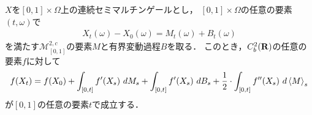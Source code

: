 	\begin{screen}
		\begin{thm}[伊藤の公式]
			$X$を$[0,1] \times \Omega$上の連続セミマルチンゲールとし，
			$[0,1] \times \Omega$の任意の要素$(t,\omega)$で
			\begin{align}
				X_{t}(\omega) - X_{0}(\omega) = M_{t}(\omega) + B_{t}(\omega)
			\end{align}
			を満たす$\mathscr{M}^{2,c}_{[0,1]}$の要素$M$と有界変動過程$B$を取る．
			このとき，$C^{2}_{b}(\mathbf{R})$の任意の要素$f$に対して
			\begin{align}
				f(X_t) = f(X_{0}) + \int_{[0,t]} f'(X_{s})\ dM_{s}
				+ \int_{[0,t]} f'(X_{s})\ dB_{s}
				+ \frac{1}{2} \cdot \int_{[0,t]} f''(X_{s})\ d\inprod<M>_{s}
			\end{align}
			が$[0,1]$の任意の要素$t$で成立する．
		\end{thm}
	\end{screen}